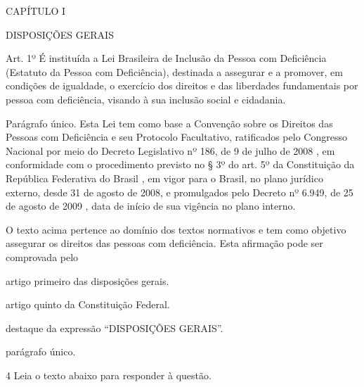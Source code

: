 \begin{myquote}

CAPÍTULO I

DISPOSIÇÕES GERAIS

Art. 1º É instituída a Lei Brasileira de Inclusão da Pessoa com
Deficiência (Estatuto da Pessoa com Deficiência), destinada a assegurar
e a promover, em condições de igualdade, o exercício dos direitos e das
liberdades fundamentais por pessoa com deficiência, visando à sua
inclusão social e cidadania.

Parágrafo único. Esta Lei tem como base a Convenção sobre os Direitos
das Pessoas com Deficiência e seu Protocolo Facultativo, ratificados
pelo Congresso Nacional por meio do Decreto Legislativo nº 186, de 9 de
julho de 2008 , em conformidade com o procedimento previsto no § 3º do
art. 5º da Constituição da República Federativa do Brasil , em vigor
para o Brasil, no plano jurídico externo, desde 31 de agosto de 2008, e
promulgados pelo Decreto nº 6.949, de 25 de agosto de 2009 , data de
início de sua vigência no plano interno.


\end{myquote}

O texto acima pertence ao domínio dos textos normativos e tem como
objetivo assegurar os direitos das pessoas com deficiência. Esta
afirmação pode ser comprovada pelo

\begin{escolha}
    
    \item artigo primeiro das disposições gerais.
    
    \item artigo quinto da Constituição Federal.
    
    \item destaque da expressão ``DISPOSIÇÕES GERAIS''.
    
    \item parágrafo único.

\end{escolha}

\num{4} Leia o texto abaixo para responder à questão. 

